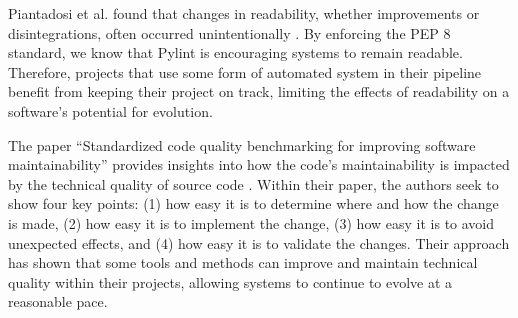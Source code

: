 Piantadosi et al. found that changes in readability, whether improvements or disintegrations, often occurred unintentionally \cite{piantadosi:2020}. By enforcing the PEP 8 standard, we know that Pylint is encouraging systems to remain readable. Therefore, projects that use some form of automated system in their pipeline benefit from keeping their project on track, limiting the effects of readability on a software's potential for evolution.

The paper ``Standardized code quality benchmarking for improving software maintainability'' provides insights into how the code's maintainability is impacted by the technical quality of source code \cite{baggen:2012}. Within their paper, the authors seek to show four key points: (1) how easy it is to determine where and how the change is made, (2) how easy it is to implement the change, (3) how easy it is to avoid unexpected effects, and (4) how easy it is to validate the changes. Their approach has shown that some tools and methods can improve and maintain technical quality within their projects, allowing systems to continue to evolve at a reasonable pace.
